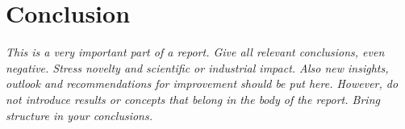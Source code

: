 \chapter{Conclusion}
\label{ch:conclusions}

\emph{This is a very important part of a report. Give all relevant conclusions, even negative. Stress novelty and scientific or industrial impact. Also new insights, outlook and recommendations for improvement should be put here. However, do not introduce results or concepts that belong in the body of the report. Bring structure in your conclusions.}